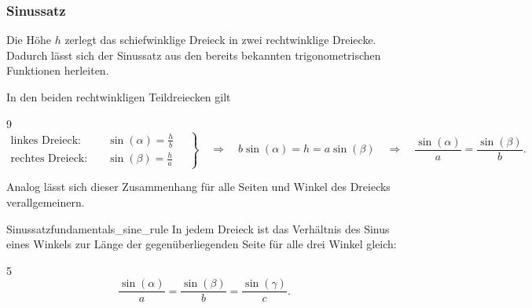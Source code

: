 \subsubsection{Sinussatz}
\label{subsubsec:fundamentals_oblique_triangles_sine_rule}

Die Höhe $h$ zerlegt das schiefwinklige Dreieck in zwei rechtwinklige
Dreiecke. Dadurch lässt sich der Sinussatz aus den bereits bekannten
trigonometrischen Funktionen herleiten.

\begin{center}
\end{center}

In den beiden rechtwinkligen Teildreiecken gilt
\begin{ClozeArea}[34]{9}
  \[
    \left.
    \begin{aligned}
      \text{linkes Dreieck:}\quad &\sin(\alpha)=\frac{h}{b}\\
      \text{rechtes Dreieck:}\quad &\sin(\beta)=\frac{h}{a}
    \end{aligned}
    \quad \right\}
    \quad\Longrightarrow\quad
    b\sin(\alpha)=h=a\sin(\beta)
    \quad\Longrightarrow\quad
    \frac{\sin(\alpha)}{a}=\frac{\sin(\beta)}{b}.
  \]
\end{ClozeArea}

Analog lässt sich dieser Zusammenhang für alle Seiten und Winkel des Dreiecks verallgemeinern.
\begin{TheoremBox}{Sinussatz}{fundamentals_sine_rule}
  In jedem Dreieck ist das Verhältnis des Sinus eines Winkels zur Länge der
  gegenüberliegenden Seite für alle drei Winkel gleich:
  \begin{ClozeArea}[20]{5}
    \[
      \frac{\sin(\alpha)}{a}=\frac{\sin(\beta)}{b}=\frac{\sin(\gamma)}{c}.
    \]
  \end{ClozeArea}
\end{TheoremBox}
